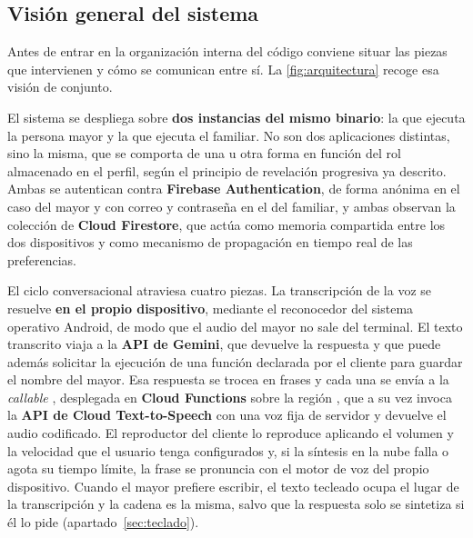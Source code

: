 \subsection{Visión general del sistema}
\label{sec:arquitectura-general}

Antes de entrar en la organización interna del código conviene situar las piezas que intervienen y cómo se
comunican entre sí. La \autoref{fig:arquitectura} recoge esa visión de conjunto.

El sistema se despliega sobre \textbf{dos instancias del mismo binario}: la que ejecuta la persona mayor y
la que ejecuta el familiar. No son dos aplicaciones distintas, sino la misma, que se comporta de una u otra
forma en función del rol almacenado en el perfil, según el principio de revelación progresiva ya descrito.
Ambas se autentican contra \textbf{Firebase Authentication}, de forma anónima en el caso del mayor y con
correo y contraseña en el del familiar, y ambas observan la colección  de \textbf{Cloud
Firestore}, que actúa como memoria compartida entre los dos dispositivos y como mecanismo de propagación en
tiempo real de las preferencias.

El ciclo conversacional atraviesa cuatro piezas. La transcripción de la voz se resuelve \textbf{en el propio
dispositivo}, mediante el reconocedor del sistema operativo Android, de modo que el audio del mayor no sale
del terminal. El texto transcrito viaja a la \textbf{API de Gemini}, que devuelve la respuesta y que puede
además solicitar la ejecución de una función declarada por el cliente para guardar el nombre del mayor. Esa
respuesta se trocea en frases y cada una se envía a la \emph{callable} , desplegada
en \textbf{Cloud Functions} sobre la región , que a su vez invoca la \textbf{API de Cloud
Text-to-Speech} con una voz fija de servidor y devuelve el audio codificado. El reproductor del cliente lo
reproduce aplicando el volumen y la velocidad que el usuario tenga configurados y, si la síntesis en la nube
falla o agota su tiempo límite, la frase se pronuncia con el motor de voz del propio dispositivo. Cuando el
mayor prefiere escribir, el texto tecleado ocupa el lugar de la transcripción y la cadena es la misma, salvo
que la respuesta solo se sintetiza si él lo pide (apartado~\ref{sec:teclado}).


